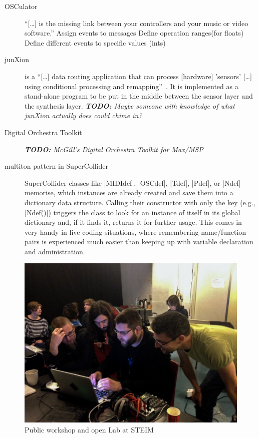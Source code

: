 \documentclass{article}
\newcommand{\todo}[1] {\emph{\textbf{TODO:} #1}}
\begin{document}
\begin{description}
	\item[OSCulator] 
		\enquote{[\dots] is the missing link between your controllers and your music or video software.}
		Assign events to messages
		Define operation ranges(for floats)
		Define different events to specific values (ints) 
	\item[junXion] 
		is a \enquote{[\dots] data routing application that can process [hardware] 'sensors' [\dots] using conditional processing and remapping}~\cite{-jun}. 
		It is implemented as a stand-alone program to be put in the middle between the sensor layer and the synthesis layer.
		\todo{Maybe someone with knowledge of what junXion actually does could chime in?}
	\item[Digital Orchestra Toolkit] \todo{McGill's Digital Orchestra Toolkit for Max/MSP}
	\item[multiton pattern in SuperCollider] 
		SuperCollider classes like |MIDIdef|, |OSCdef|, |Tdef|, |Pdef|, or |Ndef| memorise, which instances are already created and save them into a dictionary data structure. 
		Calling their constructor with only the key (e.g., |Ndef(\a)|) triggers the class to look for an instance of itself in its global dictionary and, if it finds it, returns it for further usage. This comes in very handy in live coding situations, where remembering name/function pairs is experienced much easier than keeping up with variable declaration and administration.
\end{description}


\begin{figure}[h]
	\centering
		\includegraphics[width=.9\columnwidth]{../media/20140403-IMG_1667.jpg}
	\caption{Public workshop and open Lab at STEIM}
	\label{fig:media_20140403-IMG_1667}
\end{figure}
\end{document}
